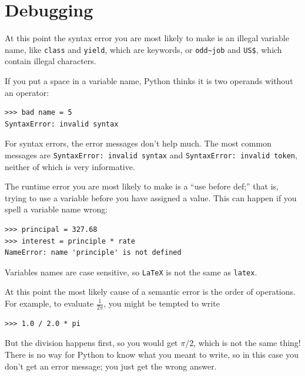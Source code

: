 \documentclass[10pt]{book}
\begin{document}
\section{Debugging}

At this point the syntax error you are most likely to make is
an illegal variable name, like {\tt class} and {\tt yield}, which
are keywords, or \verb"odd~job" and \verb"US$", which contain
illegal characters.


If you put a space in a variable name, Python thinks it is two
operands without an operator:

\beforeverb
\begin{verbatim}
>>> bad name = 5
SyntaxError: invalid syntax
\end{verbatim}
\afterverb
%
For syntax errors, the error messages don't help much.
The most common messages are {\tt SyntaxError: invalid syntax} and
{\tt SyntaxError: invalid token}, neither of which is very informative.


The runtime error you are most likely to make is a ``use before
def;'' that is, trying to use a variable before you have assigned
a value.  This can happen if you spell a variable name wrong:

\beforeverb
\begin{verbatim}
>>> principal = 327.68
>>> interest = principle * rate
NameError: name 'principle' is not defined
\end{verbatim}
\afterverb
%
Variables names are case sensitive, so {\tt LaTeX} is not the
same as {\tt latex}.


At this point the most likely cause of a semantic error is
the order of operations.  For example, to evaluate $\frac{1}{2 \pi}$,
you might be tempted to write

\beforeverb
\begin{verbatim}
>>> 1.0 / 2.0 * pi
\end{verbatim}
\afterverb
%
But the division happens first, so you would get $\pi / 2$, which
is not the same thing!  There is no way for Python
to know what you meant to write, so in this case you don't
get an error message; you just get the wrong answer.
\end{document}
